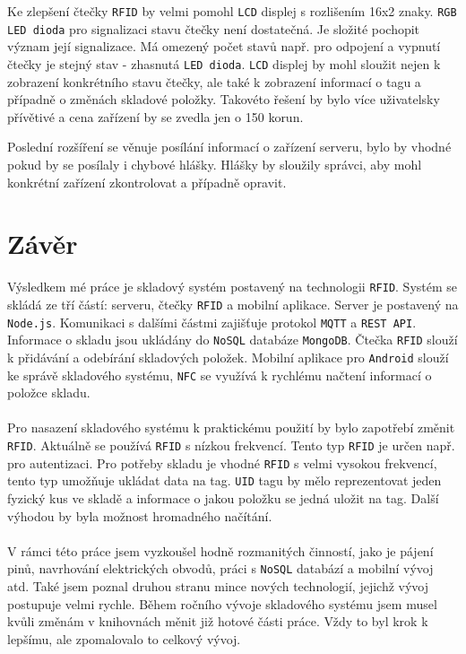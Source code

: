 \documentclass[czech,BP]{thesiskiv}
\begin{document}
Ke zlepšení čtečky \texttt{RFID} by velmi pomohl \texttt{LCD} displej s rozlišením 16x2 znaky. 
\texttt{RGB LED dioda} pro signalizaci stavu čtečky není dostatečná.
Je složité pochopit význam její signalizace. Má omezený počet stavů např. pro odpojení a vypnutí čtečky je stejný stav - zhasnutá \texttt{LED dioda}.
\texttt{LCD} displej by mohl sloužit nejen k zobrazení konkrétního stavu čtečky, ale také k zobrazení informací o tagu a případně o změnách skladové položky.
Takovéto řešení by bylo více uživatelsky přívětivé a cena zařízení by se zvedla jen o 150 korun.

Poslední rozšíření se věnuje posílání informací o zařízení serveru, bylo by vhodné pokud by se posílaly i chybové hlášky. Hlášky by sloužily správci, aby mohl konkrétní zařízení zkontrolovat a případně opravit.

\chapter{Závěr}
Výsledkem mé práce je skladový systém postavený na technologii \texttt{RFID}. Systém se skládá ze tří částí: serveru, čtečky \texttt{RFID} a mobilní aplikace. Server je postavený na \texttt{Node.js}. Komunikaci s dalšími částmi zajišťuje protokol \texttt{MQTT} a \texttt{REST API}. Informace o skladu jsou ukládány do \texttt{NoSQL} databáze \texttt{MongoDB}. Čtečka \texttt{RFID} slouží k přidávání a odebírání skladových položek. Mobilní aplikace pro \texttt{Android} slouží ke správě skladového systému, \texttt{NFC} se využívá k rychlému načtení informací o položce skladu.
\\\\
Pro nasazení skladového systému k praktickému použití by bylo zapotřebí změnit \texttt{RFID}. Aktuálně se používá \texttt{RFID} s nízkou frekvencí. Tento typ \texttt{RFID} je určen např. pro autentizaci.
Pro potřeby skladu je vhodné \texttt{RFID} s velmi vysokou frekvencí, tento typ umožňuje ukládat data na tag.
\texttt{UID} tagu by mělo reprezentovat jeden fyzický kus ve skladě a informace o jakou položku se jedná uložit na tag. Další výhodou by byla možnost hromadného načítání.
\\\\
V rámci této práce jsem vyzkoušel hodně rozmanitých činností, jako je pájení pinů, navrhování elektrických obvodů, práci s \texttt{NoSQL} databází a mobilní vývoj atd. 
Také jsem poznal druhou stranu mince nových technologií, jejichž vývoj postupuje velmi rychle. Během ročního vývoje skladového systému jsem musel kvůli změnám v knihovnách měnit již hotové části práce. Vždy to byl krok k lepšímu, ale zpomalovalo to celkový vývoj.
 
\end{document}
